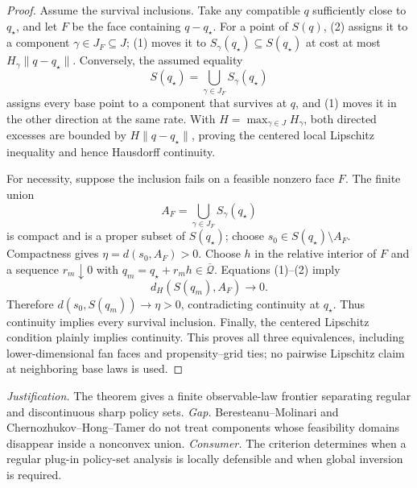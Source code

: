 \documentclass{article}
\begin{document}
\begin{proof}
Assume the survival inclusions.  Take any compatible \(q\) sufficiently close to \(q_\star\), and let \(F\) be the face containing \(q-q_\star\).  For a point of \(S(q)\), (2) assigns it to a component \(\gamma\in J_F\subseteq J\); (1) moves it to \(S_\gamma(q_\star)\subseteq S(q_\star)\) at cost at most \(H_\gamma\|q-q_\star\|\).  Conversely, the assumed equality
\[
S(q_\star)=\bigcup_{\gamma\in J_F}S_\gamma(q_\star)
\]
assigns every base point to a component that survives at \(q\), and (1) moves it in the other direction at the same rate.  With \(H=\max_{\gamma\in J}H_\gamma\), both directed excesses are bounded by \(H\|q-q_\star\|\), proving the centered local Lipschitz inequality and hence Hausdorff continuity.

For necessity, suppose the inclusion fails on a feasible nonzero face \(F\).  The finite union
\[
A_F=\bigcup_{\gamma\in J_F}S_\gamma(q_\star)
\]
is compact and is a proper subset of \(S(q_\star)\); choose \(s_0\in S(q_\star)\setminus A_F\).  Compactness gives \(\eta=d(s_0,A_F)>0\).  Choose \(h\) in the relative interior of \(F\) and a sequence \(r_m\downarrow0\) with \(q_m=q_\star+r_mh\in\overline{\mathcal Q}\).  Equations (1)--(2) imply
\[
d_H\!\left(S(q_m),A_F\right)\longrightarrow0.
\]
Therefore \(d(s_0,S(q_m))\to\eta>0\), contradicting continuity at \(q_\star\).  Thus continuity implies every survival inclusion.  Finally, the centered Lipschitz condition plainly implies continuity.  This proves all three equivalences, including lower-dimensional fan faces and propensity--grid ties; no pairwise Lipschitz claim at neighboring base laws is used.
\end{proof}
\par\smallskip\noindent \textit{Justification.} The theorem gives a finite observable-law frontier separating regular and discontinuous sharp policy sets. \textit{Gap.} Beresteanu--Molinari and Chernozhukov--Hong--Tamer do not treat components whose feasibility domains disappear inside a nonconvex union. \textit{Consumer.} The criterion determines when a regular plug-in policy-set analysis is locally defensible and when global inversion is required.
\end{document}
